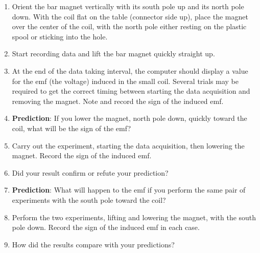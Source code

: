 \begin{enumerate}[labparts,start=2]


\item Orient the bar magnet vertically with its south pole up and its north pole down.  With the coil flat on the table (connector side up), place the magnet over the center of the coil, with the north pole either resting on the plastic spool or sticking into the hole.  

\item Start recording data and lift the bar magnet quickly straight up.

\item At the end of the data taking interval, the computer should display
a value for the emf (the voltage) induced in the small coil.
Several trials may be required to get the correct timing between starting
the data acquisition and removing the magnet. Note and record the sign of the 
induced emf.
\answerspace{8mm}

\item \textbf{Prediction}: If you lower the magnet, north pole down, quickly
toward the coil, what will be the sign of the emf? 
\answerspace{8mm}

\item Carry out the experiment, starting the data acquisition, then lowering the magnet.
Record the sign of the induced emf.
\answerspace{8mm}

\item Did your result confirm or refute your prediction?
\answerspace{15mm}

\pagebreak[3]
\item \textbf{Prediction}: What will happen to the emf if you perform the
same pair of experiments with the south pole toward the coil? \vspace{10mm}

\item Perform the two experiments, lifting and lowering the magnet, with
the south pole down. Record the sign of the induced emf in each case.\vspace{10mm}

\item How did the results compare with your predictions?\vspace{10mm}

\end{enumerate}

